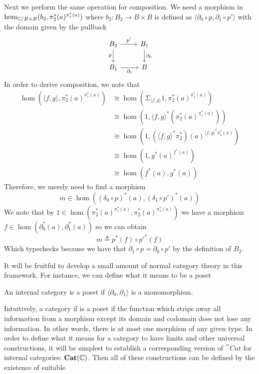 \begin{example}
  Next we perform the same operation for composition. We need a
  morphism in $\hom_{\mathbb{C}/B \times B}(b_2, \pi_2^*(a)^{\pi_1^*(a)})$
  where $b_2 : B_2 \to B \times B$ is defined as
  $\langle \partial_0 \circ p, \partial_1 \circ p' \rangle$
  with the domain given by the pullback
  \[
    \begin{tikzcd}
      B_2 \ar[r, "p'"] \ar[d, swap, "p"] & B_1 \ar[d, "\partial_0"]\\
      B_1 \ar[r, swap, "\partial_1"] & B
    \end{tikzcd}
  \]
  In order to derive composition, we note that
  \begin{align*}
    \hom(\langle f, g \rangle, \pi_2^*(a)^{\pi_1^*(a)})
    &\cong \hom(\Sigma_{\langle f, g \rangle} 1, \pi_2^*(a)^{\pi_1^*(a)})\\
    &\cong \hom(1, \langle f, g \rangle^*(\pi_2^*(a)^{\pi_1^*(a)}))\\
    &\cong \hom(1, (\langle f, g \rangle^*\pi_2^*)(a)^{\langle f, g \rangle^*\pi_1^*(a)})\\
    &\cong \hom(1, g^*(a)^{f^*(a)})\\
    &\cong \hom(f^*(a), g^*(a))
  \end{align*}
  Therefore, we merely need to find a morphism
  \[
    m \in \hom((\delta_0 \circ p)^*(a), (\delta_1 \circ p')^*(a))
  \]
  We note that by
  $1 \in \hom(\pi_2^*(a)^{\pi_1^*(a)}, \pi_2^*(a)^{\pi_1^*(a)})$ we
  have a morphism
  $f \in \hom(\partial_0^*(a), \partial_1^*(a))$ so we can obtain
  \[
    m \triangleq p^*(f) \circ p'^*(f)
  \]
  Which typechecks because we have that
  $\partial_1 \circ p = \partial_0 \circ p'$ by the definition of
  $B_2$.
\end{example}
It will be fruitful to develop a small amount of normal category
theory in this framework. For instance, we can define what it means to
be a poset
\begin{defn}\label{defn:internal:poset}
  An internal category is a poset if
  $\langle \partial_0, \partial_1 \rangle$ is a monomorphism.
\end{defn}
Intuitively, a category if is a poset if the function which strips
away all information from a morphism except its domain and codomain
does not lose any information. In other words, there is at most one
morphism of any given type. In order to define what it means for a
category to have limits and other universal constructions, it will be
simplest to establish a corresponding version of $\cat{Cat}$ for
internal categories: $\mathbf{Cat}(\mathbb{C})$. Then all of these
constructions can be defined by the existence of suitable
